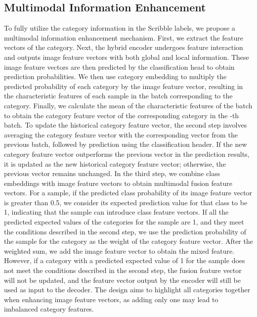 \documentclass[sigconf,natbib=false]{acmart}
\begin{document}
\subsection{Multimodal Information Enhancement}
To fully utilize the category information in the Scribble labels, we propose a multimodal information enhancement mechanism. First, we extract the feature vectors of the category. Next, the hybrid encoder undergoes feature interaction and outputs image feature vectors with both global and local information. These image feature vectors are then predicted by the classification head to obtain prediction probabilities. We then use category embedding to multiply the predicted probability of each category by the image feature vector, resulting in the characteristic features of each sample in the batch corresponding to the category. Finally, we calculate the mean of the characteristic features of the batch to obtain the category feature vector of the corresponding category in the -th batch.
To update the historical category feature vector, the second step involves averaging the category feature vector with the corresponding vector from the previous batch, followed by prediction using the classification header. If the new category feature vector outperforms the previous vector in the prediction results, it is updated as the new historical category feature vector; otherwise, the previous vector remains unchanged.
In the third step, we combine class embeddings with image feature vectors to obtain multimodal fusion feature vectors. For a sample, if the predicted class probability of its image feature vector is greater than 0.5, we consider its expected prediction value for that class to be 1, indicating that the sample can introduce class feature vectors. If all the predicted expected values of the categories for the sample are 1, and they meet the conditions described in the second step, we use the prediction probability of the sample for the category as the weight of the category feature vector. After the weighted sum, we add the image feature vector to obtain the mixed feature. However, if a category with a predicted expected value of 1 for the sample does not meet the conditions described in the second step, the fusion feature vector will not be updated, and the feature vector output by the encoder will still be used as input to the decoder. The design aims to highlight all categories together when enhancing image feature vectors, as adding only one may lead to imbalanced category features.
\end{document}
